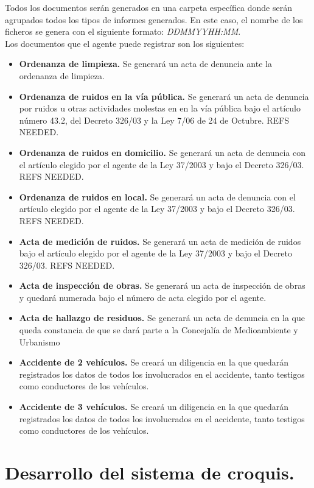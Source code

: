 Todos los documentos serán generados en una carpeta específica donde serán agrupados todos los tipos de informes generados. En este caso, el nomrbe de los ficheros se
genera con el siguiente formato: \textit{DD\textunderscore MM\textunderscore YY\textunderscore HH:MM}.\\

Los documentos que el agente puede registrar son los siguientes:

\begin{itemize}
	\item \textbf{Ordenanza de limpieza. } Se generará un acta de denuncia ante la ordenanza de limpieza.
	\item \textbf{Ordenanza de ruidos en la vía pública. } Se generará un acta de denuncia por ruidos u otras actividades molestas en en la vía pública bajo el artículo número
	43.2, del Decreto 326/03 y la Ley 7/06 de 24 de Octubre. REFS NEEDED.
	\item \textbf{Ordenanza de ruidos en domicilio. } Se generará un acta de denuncia con el artículo elegido por el agente de la Ley 37/2003 y bajo el Decreto 326/03. REFS NEEDED.
	\item \textbf{Ordenanza de ruidos en local. }  Se generará un acta de denuncia con el artículo elegido por el agente de la Ley 37/2003 y bajo el Decreto 326/03. REFS NEEDED.
	\item \textbf{Acta de medición de ruidos. } Se generará un acta de medición de ruidos bajo el artículo elegido por el agente de la Ley 37/2003 y bajo el Decreto 326/03. REFS NEEDED.
	\item \textbf{Acta de inspección de obras. }  Se generará un acta de inspección de obras y quedará numerada bajo el número de acta elegido por el agente.
	\item \textbf{Acta de hallazgo de residuos. } Se generará un acta de denuncia en la que queda constancia de que se dará parte a la Concejalía de Medioambiente y Urbanismo
	\item \textbf{Accidente de 2 vehículos. } Se creará un diligencia en la que quedarán registrados los datos de todos los involucrados en el accidente, tanto testigos como 
	conductores de los vehículos.
	\item \textbf{Accidente de 3 vehículos. } Se creará un diligencia en la que quedarán registrados los datos de todos los involucrados en el accidente, tanto testigos como 
	conductores de los vehículos.
\end{itemize}

\section{Desarrollo del sistema de croquis.}

